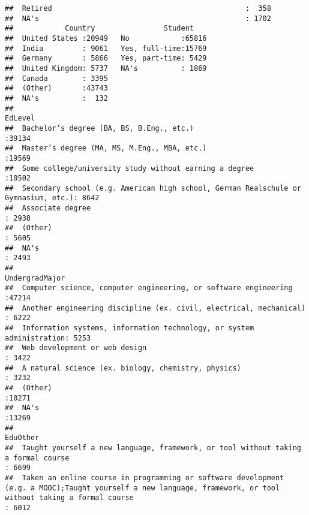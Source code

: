 \documentclass[]{article}
\begin{document}
\begin{verbatim}
##  Retired                                             :  358  
##  NA's                                                : 1702  
##            Country                Student     
##  United States :20949   No            :65816  
##  India         : 9061   Yes, full-time:15769  
##  Germany       : 5866   Yes, part-time: 5429  
##  United Kingdom: 5737   NA's          : 1869  
##  Canada        : 3395                         
##  (Other)       :43743                         
##  NA's          :  132                         
##                                                                                EdLevel     
##  Bachelor’s degree (BA, BS, B.Eng., etc.)                                          :39134  
##  Master’s degree (MA, MS, M.Eng., MBA, etc.)                                       :19569  
##  Some college/university study without earning a degree                            :10502  
##  Secondary school (e.g. American high school, German Realschule or Gymnasium, etc.): 8642  
##  Associate degree                                                                  : 2938  
##  (Other)                                                                           : 5605  
##  NA's                                                                              : 2493  
##                                                                UndergradMajor 
##  Computer science, computer engineering, or software engineering      :47214  
##  Another engineering discipline (ex. civil, electrical, mechanical)   : 6222  
##  Information systems, information technology, or system administration: 5253  
##  Web development or web design                                        : 3422  
##  A natural science (ex. biology, chemistry, physics)                  : 3232  
##  (Other)                                                              :10271  
##  NA's                                                                 :13269  
##                                                                                                                                                                                                                EduOther    
##  Taught yourself a new language, framework, or tool without taking a formal course                                                                                                                                 : 6699  
##  Taken an online course in programming or software development (e.g. a MOOC);Taught yourself a new language, framework, or tool without taking a formal course                                                     : 6012  

\end{verbatim}
\end{document}
